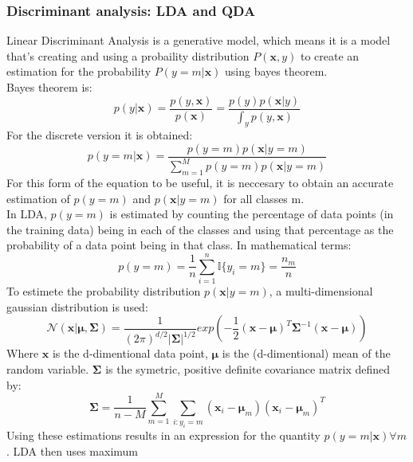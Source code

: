     

    
\subsubsection{Discriminant analysis: LDA and QDA}

Linear Discriminant Analysis is a generative model, which means it is a model that's creating and using a probaility 
distribution $P(\mathbf{x}, y)$ to create an estimation for the probability $P(y=m|\mathbf{x})$ using bayes theorem.
\\
Bayes theorem is:
\begin{equation*}
    p(y|\mathbf{x}) = \frac{p(y,\mathbf{x})}{p(\mathbf{x})} = \frac{p(y)p(\mathbf{x}|y)}{\int_y p(y,\mathbf{x})}
\end{equation*}
For the discrete version it is obtained:
\begin{equation*}
    p(y=m|\mathbf{x}) = \frac{p(y=m)p(\mathbf{x}|y=m)}{\sum_{m=1}^{M} p(y=m) p(\mathbf{x}|y=m)}
\end{equation*}
For this form of the equation to be useful, it is neccesary to obtain an accurate estimation of $p(y=m)$ and $p(\mathbf{x}|y=m)$
for all classes m. 
\\
In LDA, $p(y=m)$ is estimated by counting the percentage of data points (in the training data) being in each of the classes 
and using that percentage as the probability of a data point being in that class. In mathematical terms:
\begin{equation*}
    p(y=m) = \frac{1}{n}\sum_{i=1}^{n}\mathbb{I}\{y_i=m\} = \frac{n_m}{n}
\end{equation*}  
To estimete the probability distribution $p(\mathbf{x}|y=m)$, a multi-dimensional gaussian distribution is used: 
\begin{equation*}
    \mathcal{N}(\mathbf{x}|\mathbf{\mu}, \mathbf{\Sigma}) = \frac{1}{(2 \pi)^{d/2} |\mathbf{\Sigma}|^{1/2}} 
    exp \left( -\frac{1}{2}(\mathbf{x}-\mathbf{\mu})^T \mathbf{\Sigma}^{-1} (\mathbf{x}-\mathbf{\mu})\right)
\end{equation*}
Where $\mathbf{x}$ is the d-dimentional data point, $\mathbf{\mu}$ is the (d-dimentional) mean of the random variable.
$\mathbf{\Sigma}$ is the symetric, positive definite covariance matrix defined by:
\begin{equation*}
    \mathbf{\Sigma} = \frac{1}{n-M}\sum_{m=1}^{M} \sum_{i:y_i=m} 
    (\mathbf{x}_i-\mathbf{\mu}_m)(\mathbf{x}_i-\mathbf{\mu}_m)^T
\end{equation*}
Using these estimations results in an expression for the quantity $p(y=m|\mathbf{x}) \forall m$. LDA then uses maximum
